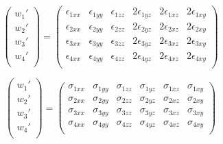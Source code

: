 \begin{equation}
\begin{pmatrix}
{w_1}' \\
{w_2}' \\
{w_3}' \\
{w_4}' \\
\end{pmatrix} = \begin{pmatrix}
\epsilon_{1xx} & \epsilon_{1yy} & \epsilon_{1zz} & 2\epsilon_{1yz} & 2\epsilon_{1xz} & 2\epsilon_{1xy}   \\
\epsilon_{2xx} & \epsilon_{2yy} & \epsilon_{2zz} & 2\epsilon_{2yz} & 2\epsilon_{2xz} & 2\epsilon_{2xy}   \\
\epsilon_{3xx} & \epsilon_{3yy} & \epsilon_{3zz} & 2\epsilon_{3yz} & 2\epsilon_{3xz} & 2\epsilon_{3xy}   \\
\epsilon_{4xx} & \epsilon_{4yy} & \epsilon_{4zz} & 2\epsilon_{4yz} & 2\epsilon_{4xz} & 2\epsilon_{4xy}   \\
\end{pmatrix}
\end{equation}

\begin{equation}
\begin{pmatrix}
{w_1}' \\
{w_2}' \\
{w_3}' \\
{w_4}' \\
\end{pmatrix} = \begin{pmatrix}
\sigma_{1xx} & \sigma_{1yy} & \sigma_{1zz} & \sigma_{1yz} & \sigma_{1xz} & \sigma_{1xy}   \\
\sigma_{2xx} & \sigma_{2yy} & \sigma_{2zz} & \sigma_{2yz} & \sigma_{2xz} & \sigma_{2xy} \\
\sigma_{3xx} & \sigma_{3yy} & \sigma_{3zz} & \sigma_{3yz} & \sigma_{3xz} & \sigma_{3xy} \\
\sigma_{4xx} & \sigma_{4yy} & \sigma_{4zz} & \sigma_{4yz} & \sigma_{4xz} & \sigma_{4xy}  \\
\end{pmatrix}
\end{equation}

